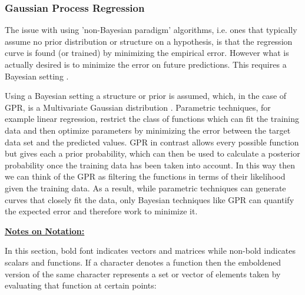 \documentclass[10.5pt,a4paper,twoside]{report}   %
\begin{document}
\subsubsection{Gaussian Process Regression}
\label{sec:gprmltemp}

The issue with using 'non-Bayesian paradigm' algorithms, i.e. ones that typically assume no prior distribution or structure on a hypothesis,  is that the regression curve is found (or trained) by minimizing the empirical error.  However what is actually desired is to minimize the error on future predictions. This requires a Bayesian setting \cite{MITGPRbook, edsnelgpr}.

	Using a Bayesian setting a structure or prior is assumed, which, in the case of GPR, is a Multivariate Gaussian distribution \cite{MITGPRbook,StanfordStats}.  Parametric techniques, for example linear regression, restrict the class of functions which can fit the training data and then optimize parameters by minimizing the error between the target data set and the predicted values\cite{MITGPRbook,dukegpr}. GPR in contrast allows every possible function but gives each a prior probability, which can then be used to calculate a posterior probability once the training data has been taken into account. In this way then we can think of the GPR as filtering the functions in terms of their likelihood given the training data. As a result, while parametric techniques can generate curves that closely fit the data, only Bayesian techniques like GPR can quantify the expected error and therefore work to minimize it\cite{MITGPRbook,GPMLDoc,GPROpt,scikitlearn}.

\noindent \underline{\textbf{Notes on Notation:}}

In this section, bold font indicates vectors and matrices while non-bold indicates scalars and functions. If a character denotes a function then the emboldened version of the same character represents a set or vector of elements taken by evaluating that function at certain points:
\end{document}
